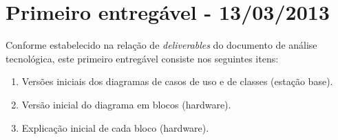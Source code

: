 \chapter{Primeiro entregável - 13/03/2013}

Conforme estabelecido na relação de \textit{deliverables} do documento de análise tecnológica, este primeiro entregável consiste nos seguintes itens:
\begin{enumerate}[topsep=0pt, partopsep=0pt, itemsep=0pt]
	\item Versões iniciais dos diagramas de casos de uso e de classes (estação base).
	\item Versão inicial do diagrama em blocos (hardware).
	\item Explicação inicial de cada bloco (hardware).
\end{enumerate}

